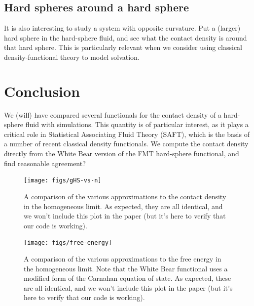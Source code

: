 \documentclass[letterpaper,twocolumn,amsmath,amssymb,prb]{revtex4-1}
\begin{document}
\subsection{Hard spheres around a hard sphere}

It is also interesting to study a system with opposite curvature.  Put
a (larger) hard sphere in the hard-sphere fluid, and see what the
contact density is around that hard sphere.  This is particularly
relevant when we consider using classical density-functional theory to
model solvation.


\section{Conclusion}
We (will) have compared several functionals for the contact density of
a hard-sphere fluid with simulations.  This quantity is of particular
interest, as it plays a critical role in Statistical Associating Fluid
Theory (SAFT), which is the basis of a number of recent classical
density functionals.  We compute the contact density directly from the
White Bear version of the FMT hard-sphere functional, and find
reasonable agreement?

\appendix

\begin{figure}
\texttt{[image: figs/gHS-vs-n]}
\caption{A comparison of the various approximations to the contact
  density in the homogeneous limit.  As expected, they are all
  identical, and we won't include this plot in the paper (but it's
  here to verify that our code is working).}
\label{fig:gHS-vs-n}
\end{figure}

\begin{figure}
\texttt{[image: figs/free-energy]}
\caption{A comparison of the various approximations to the free energy
  in the homogeneous limit.  Note that the White Bear functional uses
  a modified form of the Carnahan equation of state.  As expected,
  these are all identical, and we won't include this plot in the paper
  (but it's here to verify that our code is working).}
\label{fig:free-energy}
\end{figure}
\end{document}
